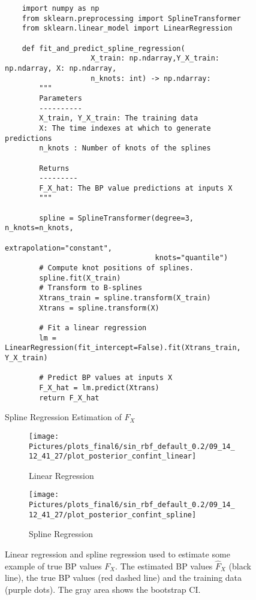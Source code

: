 %
\begin{figure}[!htb]
\centering

\begin{verbatim}
    import numpy as np
    from sklearn.preprocessing import SplineTransformer
    from sklearn.linear_model import LinearRegression

    def fit_and_predict_spline_regression(
                    X_train: np.ndarray,Y_X_train: np.ndarray, X: np.ndarray,
                    n_knots: int) -> np.ndarray:
        """
        Parameters
        ----------
        X_train, Y_X_train: The training data
        X: The time indexes at which to generate predictions
        n_knots : Number of knots of the splines

        Returns
        ---------
        F_X_hat: The BP value predictions at inputs X
        """

        spline = SplineTransformer(degree=3, n_knots=n_knots,
                                   extrapolation="constant",
                                   knots="quantile")
        # Compute knot positions of splines.
        spline.fit(X_train)
        # Transform to B-splines
        Xtrans_train = spline.transform(X_train)
        Xtrans = spline.transform(X)

        # Fit a linear regression
        lm = LinearRegression(fit_intercept=False).fit(Xtrans_train, Y_X_train)

        # Predict BP values at inputs X
        F_X_hat = lm.predict(Xtrans)
        return F_X_hat

\end{verbatim}
\caption{Spline Regression Estimation of $F_X$}
\label{code:smoothing-spline}
\end{figure}



\begin{figure}[!htb]
\centering
\begin{subfigure}{.5\textwidth}
    \centering
    \texttt{[image: 
        Pictures/plots\_final6/sin\_rbf\_default\_0.2/09\_14\_12\_41\_27/plot\_posterior\_confint\_linear]}
    \caption{Linear Regression}
    \label{fig:post-linear}
\end{subfigure}\hfill
\begin{subfigure}{.5\textwidth}
    \centering
    \texttt{[image: 
        Pictures/plots\_final6/sin\_rbf\_default\_0.2/09\_14\_12\_41\_27/plot\_posterior\_confint\_spline]}
    \caption{Spline Regression}
    \label{fig:post-spline}
\end{subfigure}
\caption[Linear Regression and Spline Regression Prediction Examples]{Linear regression and spline regression used
to estimate some example of true BP values $F_X$. The estimated BP values $\hat{F}_X$ (black line), the
        true BP values (red dashed line) and the training data (purple dots). The gray area shows
the bootstrap CI.}
\label{fig:regression-example}
\end{figure}


